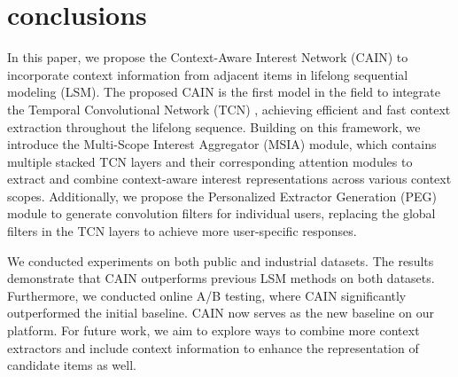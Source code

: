 \section{conclusions}

In this paper, we propose the Context-Aware Interest Network (CAIN) to incorporate context information from adjacent items in lifelong sequential modeling (LSM). The proposed CAIN is the first model in the field to integrate the Temporal Convolutional Network (TCN) \cite{bai2018empirical}, achieving efficient and fast context extraction throughout the lifelong sequence. Building on this framework, we introduce the Multi-Scope Interest Aggregator (MSIA) module, which contains multiple stacked TCN layers and their corresponding attention modules to extract and combine context-aware interest representations across various context scopes. Additionally, we propose the Personalized Extractor Generation (PEG) module to generate convolution filters for individual users, replacing the global filters in the TCN layers to achieve more user-specific responses. 

We conducted experiments on both public and industrial datasets. The results demonstrate that CAIN outperforms previous LSM methods on both datasets. Furthermore, we conducted online A/B testing, where CAIN significantly outperformed the initial baseline. CAIN now serves as the new baseline on our platform. For future work, we aim to explore ways to combine more context extractors and include context information to enhance the representation of candidate items as well. 
